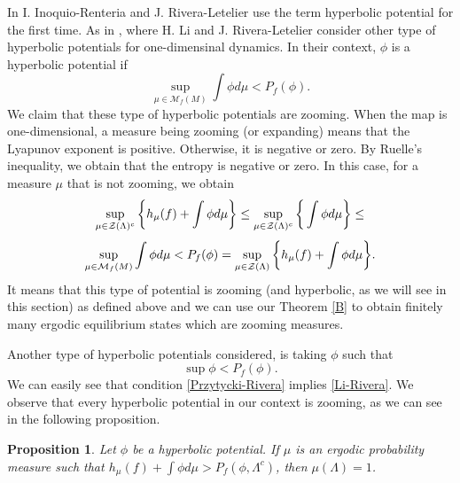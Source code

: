 \documentclass[12pt,a4paper]{amsart}
\theoremstyle{plain}
\newtheorem{proposition}{Proposition}[subsection]
\begin{document}
In \cite{IRL} I. Inoquio-Renteria and J. Rivera-Letelier use the term hyperbolic potential for the first time. As in \cite{LRL}, where H. Li and J. Rivera-Letelier consider other type of hyperbolic potentials for one-dimensinal dynamics. In their context, $\phi$ is a hyperbolic potential if
\begin{equation}\label{Li-Rivera}
	\displaystyle \sup_{\mu \in \mathcal{M}_{f}(M)} \int \phi d\mu < P_{f}(\phi).	
\end{equation}
We claim that these type of hyperbolic potentials are zooming. When the map is one-dimensional, a measure being zooming (or expanding) means that the Lyapunov exponent is positive. Otherwise, it is negative or zero. By Ruelle's inequality, we obtain that the entropy is negative or zero. In this case, for a measure $\mu$ that is not zooming, we obtain
\[
\displaystyle \sup_{\mu \in \mathcal{Z}(\Lambda)^{c}} \bigg{\{} h_{\mu}(f) + \int \phi d \mu \bigg{\}} \leq \sup_{\mu \in \mathcal{Z}(\Lambda)^{c}}\bigg{\{}\int \phi d \mu \bigg{\}} \leq 
\]
\[
\sup_{\mu \in \mathcal{M}_{f}(M)} \int \phi d\mu < P_{f}(\phi)=\sup_{\mu \in \mathcal{Z}(\Lambda)} \bigg{\{} h_{\mu}(f) + \int \phi d \mu \bigg{\}}.	
\]
It means that this type of potential is zooming (and hyperbolic, as we will see in this section) as defined above and we can use our Theorem \ref{B} to obtain finitely many ergodic equilibrium states which are zooming measures.

Another type of hyperbolic potentials considered, is taking $\phi$ such that
\begin{equation}\label{Przytycki-Rivera}
	\sup \phi < P_{f}(\phi).
\end{equation}
We can easily see that condition \ref{Przytycki-Rivera} implies \ref{Li-Rivera}.
We observe that every hyperbolic potential in our context is zooming, as we can see in the following proposition.

\begin{proposition}\label{HZ}
	Let $\phi$ be  a hyperbolic potential. If $\mu$ is an ergodic probability measure such that $h_{\mu}(f) + \int \phi d\mu > P_{f}(\phi,\Lambda^{c})$, then $\mu(\Lambda)=1$.
\end{proposition}

%	
\end{document}
